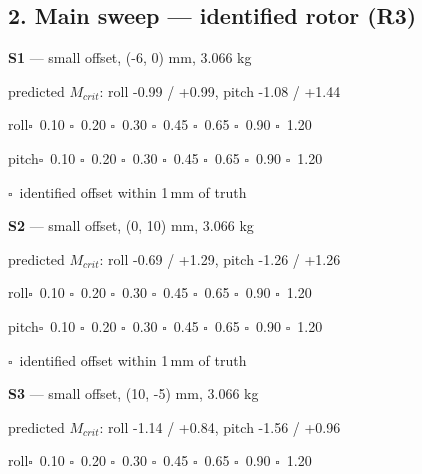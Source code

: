 \documentclass[10pt]{article}
\begin{document}
\subsection*{2. Main sweep --- identified rotor (R3)}
\textbf{S1} --- small offset, (-6, 0) mm, 3.066 kg\par
\hspace*{6mm}\footnotesize predicted $M_{crit}$: roll -0.99 / +0.99, pitch -1.08 / +1.44\normalsize\par
\hspace*{6mm}roll\quad $\square$~0.10 \quad $\square$~0.20 \quad $\square$~0.30 \quad $\square$~0.45 \quad $\square$~0.65 \quad $\square$~0.90 \quad $\square$~1.20\par
\hspace*{6mm}pitch\quad $\square$~0.10 \quad $\square$~0.20 \quad $\square$~0.30 \quad $\square$~0.45 \quad $\square$~0.65 \quad $\square$~0.90 \quad $\square$~1.20\par
\hspace*{6mm}$\square$~identified offset within 1\,mm of truth\par\medskip
\textbf{S2} --- small offset, (0, 10) mm, 3.066 kg\par
\hspace*{6mm}\footnotesize predicted $M_{crit}$: roll -0.69 / +1.29, pitch -1.26 / +1.26\normalsize\par
\hspace*{6mm}roll\quad $\square$~0.10 \quad $\square$~0.20 \quad $\square$~0.30 \quad $\square$~0.45 \quad $\square$~0.65 \quad $\square$~0.90 \quad $\square$~1.20\par
\hspace*{6mm}pitch\quad $\square$~0.10 \quad $\square$~0.20 \quad $\square$~0.30 \quad $\square$~0.45 \quad $\square$~0.65 \quad $\square$~0.90 \quad $\square$~1.20\par
\hspace*{6mm}$\square$~identified offset within 1\,mm of truth\par\medskip
\textbf{S3} --- small offset, (10, -5) mm, 3.066 kg\par
\hspace*{6mm}\footnotesize predicted $M_{crit}$: roll -1.14 / +0.84, pitch -1.56 / +0.96\normalsize\par
\hspace*{6mm}roll\quad $\square$~0.10 \quad $\square$~0.20 \quad $\square$~0.30 \quad $\square$~0.45 \quad $\square$~0.65 \quad $\square$~0.90 \quad $\square$~1.20\par
\end{document}
